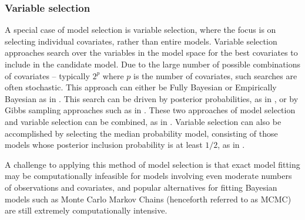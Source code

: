 \subsubsection{Variable selection}
A special case of model selection is variable selection, where the focus is on selecting individual
covariates, rather than entire models. Variable selection approaches search over the
variables in the model space for the best covariates to include in the candidate model. Due to the large
number of possible combinations of covariates -- typically $2^p$ where $p$ is the number of covariates, such
searches are often stochastic. This approach can either be Fully Bayesian or Empirically Bayesian as in
\cite{Cui2008}.  This search can be driven by posterior probabilities, as in \cite{Casella2006}, or by Gibbs
sampling approaches such as in \cite{George1993}. These two approaches of model selection and variable
selection can be combined, as in \cite{Geweke1996}. Variable selection can also be accomplished by selecting
the median probability model, consisting of those models whose posterior inclusion probability is at least
$1/2$, as in \cite{Barbieri2004}.

A challenge to applying this method of model selection is that exact model fitting may be computationally
infeasible for models involving even moderate numbers of observations and covariates, and popular alternatives
for fitting Bayesian models such as Monte Carlo Markov Chains (henceforth referred to as MCMC) are still
extremely computationally intensive.






